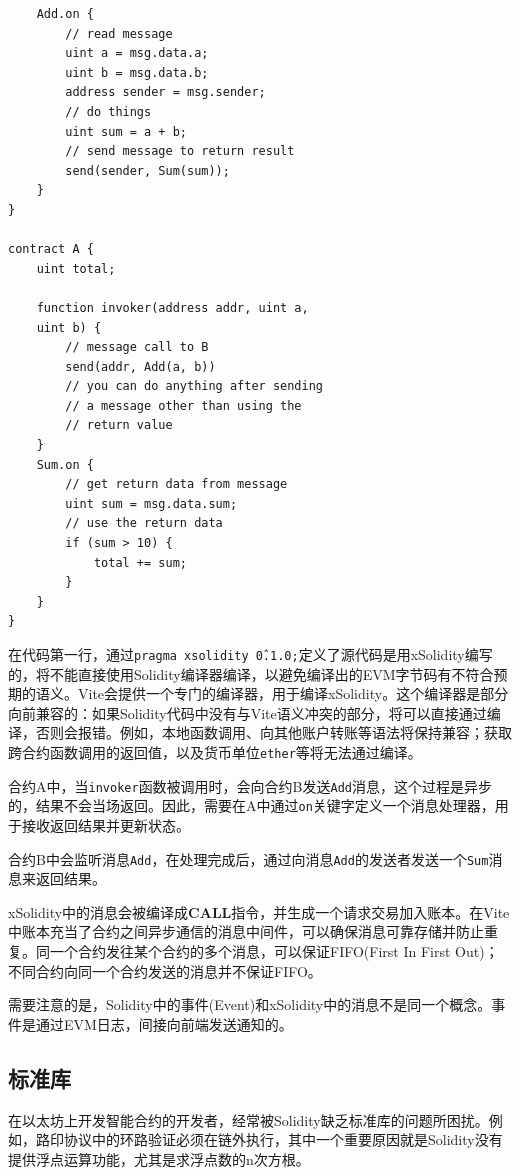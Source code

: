 \documentclass[UTF8,nofonts]{ctexart}
\begin{document}
\begin{multicols}{2}
\begin{verbatim}
    Add.on {
        // read message
        uint a = msg.data.a;
        uint b = msg.data.b;
        address sender = msg.sender;
        // do things 
        uint sum = a + b;
        // send message to return result
        send(sender, Sum(sum));
    }
}

contract A {
    uint total;    
   
    function invoker(address addr, uint a,
    uint b) {
        // message call to B
        send(addr, Add(a, b))        
        // you can do anything after sending
        // a message other than using the 
        // return value
    }
    Sum.on {
        // get return data from message
        uint sum = msg.data.sum;
        // use the return data
        if (sum > 10) {
            total += sum;
        }
    }
}
\end{verbatim}

在代码第一行，通过\texttt{pragma xsolidity \^0.1.0;}定义了源代码是用xSolidity编写的，将不能直接使用Solidity编译器编译，以避免编译出的EVM字节码有不符合预期的语义。Vite会提供一个专门的编译器，用于编译xSolidity。这个编译器是部分向前兼容的：如果Solidity代码中没有与Vite语义冲突的部分，将可以直接通过编译，否则会报错。例如，本地函数调用、向其他账户转账等语法将保持兼容；获取跨合约函数调用的返回值，以及货币单位\texttt{ether}等将无法通过编译。

合约A中，当\texttt{invoker}函数被调用时，会向合约B发送\texttt{Add}消息，这个过程是异步的，结果不会当场返回。因此，需要在A中通过\texttt{on}关键字定义一个消息处理器，用于接收返回结果并更新状态。

合约B中会监听消息\texttt{Add}，在处理完成后，通过向消息\texttt{Add}的发送者发送一个\texttt{Sum}消息来返回结果。

xSolidity中的消息会被编译成\textbf{CALL}指令，并生成一个请求交易加入账本。在Vite中账本充当了合约之间异步通信的消息中间件，可以确保消息可靠存储并防止重复。同一个合约发往某个合约的多个消息，可以保证FIFO(First In First Out)；不同合约向同一个合约发送的消息并不保证FIFO。

需要注意的是，Solidity中的事件(Event)和xSolidity中的消息不是同一个概念。事件是通过EVM日志，间接向前端发送通知的。

\subsection{标准库}
在以太坊上开发智能合约的开发者，经常被Solidity缺乏标准库的问题所困扰。例如，路印协议中的环路验证必须在链外执行，其中一个重要原因就是Solidity没有提供浮点运算功能，尤其是求浮点数的n次方根\cite{loopring}。


\end{multicols}
\end{document}

